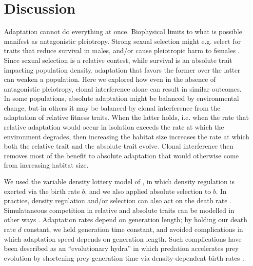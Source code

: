 \documentclass[9pt,twocolumn,twoside,lineno]{gsajnl}
\begin{document}
\section{Discussion}

Adaptation cannot do everything at once. Biophysical limits to what is possible manifest as antagonistic pleiotropy. Strong sexual selection might e.g. select for traits that reduce survival in males, and/or cause pleiotropic harm to females \citep{GomezLlano2023}. Since sexual selection is a relative contest, while survival is an absolute trait impacting population density, adaptation that favors the former over the latter can weaken a population. Here we explored how even in the absence of antagonistic pleiotropy, clonal interference alone can result in similar outcomes. In some populations, absolute adaptation might be balanced by environmental change, but in others it may be balanced by clonal interference from the adaptation of relative fitness traits. When the latter holds, i.e. when the rate that relative adaptation would occur in isolation exceeds the rate at which the environment degrades, then increasing the habitat size increases the rate at which both the relative trait and the absolute trait evolve. Clonal interference then removes most of the benefit to absolute adaptation that would otherwise come from increasing habitat size.

We used the variable density lottery model of \cite{bertram2019density}, in which density regulation is exerted via the birth rate $b$, and we also applied absolute selection to $b$. In practice, density regulation and/or selection can also act on the death rate \citep{Draghi2024}. Simulataneous competition in relative and absolute traits can be modelled in other ways \citep{Smith2026,SmithMasel2025}. Adaptation rates depend on generation length; by holding our death rate $d$ constant, we held generation time constant, and avoided complications in which adaptation speed depends on generation length. Such complications have been described as an ``evolutionary hydra'' in which predation accelerates prey evolution by shortening prey generation time via density-dependent birth rates \citep{Osmond2017}.
\end{document}
